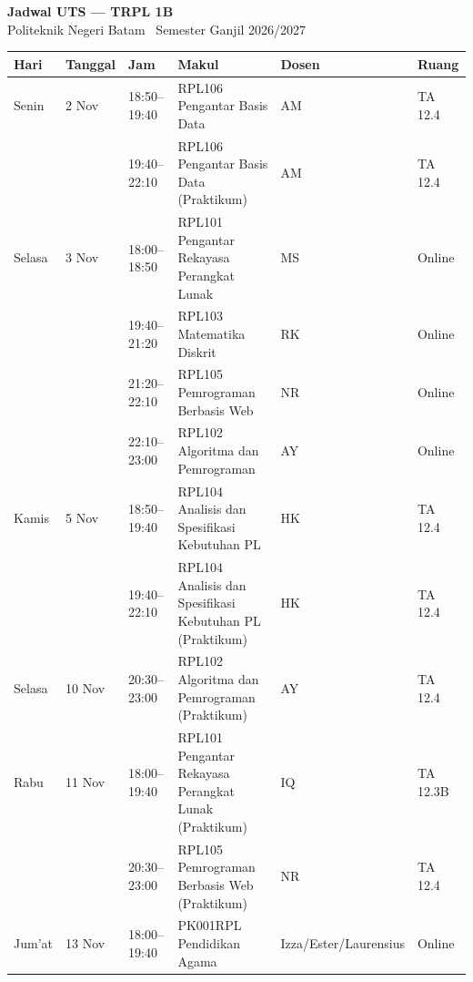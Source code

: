 \documentclass[11pt,a4paper]{article}
\begin{document}
\begin{center}
	{\LARGE \textbf{Jadwal UTS --- TRPL 1B}} \\[0.2cm]
	{\small Politeknik Negeri Batam \textbullet\ Semester Ganjil 2026/2027}
\end{center}

\vspace{0.3cm}
\noindent\small
\renewcommand{\arraystretch}{1.3}

\begin{tabular}{@{} l l l l l l @{}}
	\toprule
	\textbf{Hari} & \textbf{Tanggal} & \textbf{Jam} & \textbf{Makul}                                           & \textbf{Dosen}        & \textbf{Ruang} \\
	\midrule
	Senin         & 2 Nov            & 18:50--19:40 & RPL106 Pengantar Basis Data                              & AM                    & TA 12.4        \\
	              &                  & 19:40--22:10 & RPL106 Pengantar Basis Data (Praktikum)                  & AM                    & TA 12.4        \\
	\addlinespace
	Selasa        & 3 Nov            & 18:00--18:50 & RPL101 Pengantar Rekayasa Perangkat Lunak                & MS                    & Online         \\
	              &                  & 19:40--21:20 & RPL103 Matematika Diskrit                                & RK                    & Online         \\
	              &                  & 21:20--22:10 & RPL105 Pemrograman Berbasis Web                          & NR                    & Online         \\
	              &                  & 22:10--23:00 & RPL102 Algoritma dan Pemrograman                         & AY                    & Online         \\
	\addlinespace
	Kamis         & 5 Nov            & 18:50--19:40 & RPL104 Analisis dan Spesifikasi Kebutuhan PL             & HK                    & TA 12.4        \\
	              &                  & 19:40--22:10 & RPL104 Analisis dan Spesifikasi Kebutuhan PL (Praktikum) & HK                    & TA 12.4        \\
	\addlinespace
	Selasa        & 10 Nov           & 20:30--23:00 & RPL102 Algoritma dan Pemrograman (Praktikum)             & AY                    & TA 12.4        \\
	\addlinespace
	Rabu          & 11 Nov           & 18:00--19:40 & RPL101 Pengantar Rekayasa Perangkat Lunak (Praktikum)    & IQ                    & TA 12.3B       \\
	              &                  & 20:30--23:00 & RPL105 Pemrograman Berbasis Web (Praktikum)              & NR                    & TA 12.4        \\
	\addlinespace
	Jum'at        & 13 Nov           & 18:00--19:40 & PK001RPL Pendidikan Agama                                & Izza/Ester/Laurensius & Online         \\
	\bottomrule
\end{tabular}
\end{document}
